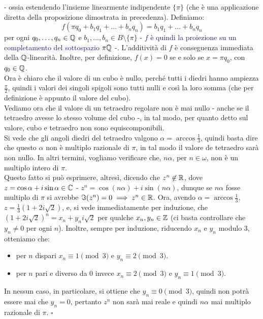 	- ossia estendendo l'insieme linearmente indipendente $\{\pi\}$ (che \`e una applicazione diretta della proposizione dimostrata in precedenza).
	Definiamo:
	\[ f(\pi q_0 + b_1 q_1 + \ldots + b_n q_n) = b_1 q_1 + \ldots + b_nq_n
		\]
	per ogni $q_0,\ldots,q_n \in \mathbb Q$ e $b_1,\ldots,b_n \in B \setminus \{\pi\}$ \textcolor{MidnightBlue}{- $f$ \`e quindi la proiezione su un completamento del sottospazio $\pi \mathbb Q$ -}. L'additivit\`a di $f$ \`e conseguenza immediata della $\mathbb Q$-linearit\`a.
	Inoltre, per definizione, $f(x) = 0$ se e solo se $x = \pi q_0$, con $q_0 \in \mathbb Q$.\\
	Ora \`e chiaro che il valore di un cubo \`e nullo, perch\'e tutti i diedri hanno ampiezza $\frac{\pi}{2}$, quindi i valori dei singoli spigoli sono tutti nulli e cos\`i la loro somma (che per definizione \`e appunto il valore del cubo).\\
	Vediamo ora che il valore di un tetraedro regolare non \`e mai nullo - anche se il tetraedro avesse lo stesso volume del cubo -, in tal modo, per quanto detto sul valore, cubo e tetraedro non sono equiscomponibili.\\
	Si vede che gli angoli diedri del tetraedro valgono $\alpha = \arccos\frac 13$, quindi basta dire che questo $\alpha$ non \`e multiplo razionale di $\pi$, in tal modo il valore de tetraedro sar\`a non nullo. In altri termini,
	vogliamo verificare che, $n\alpha$, per $n \in \omega$, non \`e un multiplo intero di $\pi$.\\
	Questo fatto si pu\`o esprimere, altres\`i, dicendo che $z^n \not\in \mathbb R$, dove $z = \cos \alpha + i \sin \alpha \in \mathbb C$ - $z^n = \cos(n\alpha) + i \sin(n\alpha)$, dunque se $n\alpha$ fosse multiplo di $\pi$ si avrebbe $\Im(z^n) = 0 \implies z^n \in \mathbb R$.
	Ora, avendo $\alpha = \arccos \frac 13$, $z = \frac{1}{3}(1 + 2i \sqrt 2)$, e, si vede immediatamente per induzione, che
	$(1 + 2i\sqrt 2)^n = x_n + y_n i \sqrt 2$ per qualche $x_n,y_n \in \mathbb Z$ (ci basta controllare che $y_n \ne 0$ per ogni $n$). Inoltre, sempre per induzione, riducendo $x_n$ e $y_n$ modulo 3, otteniamo che:
	\begin{itemize}
		\item per $n$ dispari $x_n \equiv 1 \pmod 3$ e $y_n \equiv 2 \pmod 3$.
		\item per $n$ pari e diverso da 0 invece $x_n \equiv 2 \pmod 3$ e $y_n \equiv 1 \pmod 3$.
	\end{itemize}
	In nessun caso, in particolare, si ottiene che $y_n \equiv 0 \pmod 3$, quindi non potr\`a essere mai che $y_n = 0$, pertanto $z^n$ non sar\`a mai reale e quindi $n\alpha$ mai multiplo razionale di $\pi$. \hfill $\square$
\newpage
